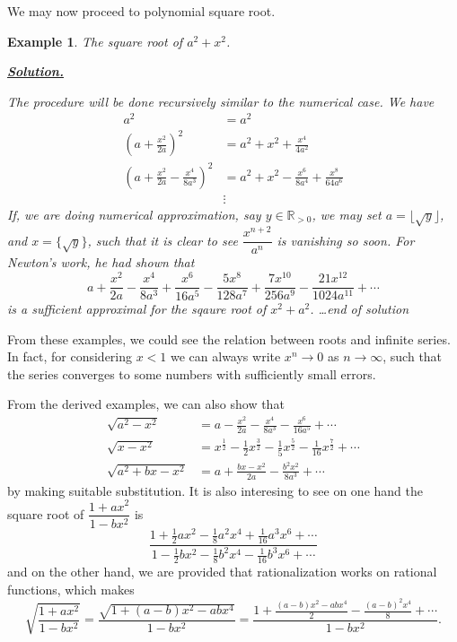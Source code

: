 \documentclass[12pt]{article}
\newtheorem*{example}{Example}
\newenvironment{solution}{\begin{snugshade*} \underline{\textbf{Solution.}} \par}{\hfill \textit{\dots end of solution} \end{snugshade*}}
\begin{document}
    We may now proceed to polynomial square root.

    \begin{example}
        The square root of $a^2+x^2$.

        \begin{solution}
            The procedure will be done recursively similar to the numerical case. We have \begin{align*}
                a^2&=a^2\\
                (a+\frac{x^2}{2a})^2&=a^2+x^2+\frac{x^4}{4a^2}\\
                (a+\frac{x^2}{2a}-\frac{x^4}{8a^3})^2&=a^2+x^2-\frac{x^6}{8a^4}+\frac{x^8}{64a^6}\\
                &\vdots
            \end{align*}
            If, we are doing numerical approximation, say $y\in\mathbb{R}_{>0}$, we may set $a=\lfloor \sqrt{y} \rfloor$, and $x=\{\sqrt{y}\}$, such that it is clear to see $\dfrac{x^{n+2}}{a^n}$ is vanishing so soon. For Newton's work, he had shown that \[a+\frac{x^2}{2a}-\frac{x^4}{8a^3}+\frac{x^{6}}{16a^5}-\frac{5x^8}{128a^7}+\frac{7x^{10}}{256a^9}-\frac{21x^{12}}{1024a^{11}}+\cdots\] is a sufficient approximal for the sqaure root of $x^2+a^2$.
        \end{solution}
    \end{example}

    From these examples, we could see the relation between roots and infinite series. In fact, for considering $x<1$ we can always write $x^n\to 0$ as $n\to \infty$, such that the series converges to some numbers with sufficiently small errors.

    From the derived examples, we can also show that \begin{align*}
        \sqrt{a^2-x^2}&=a-\frac{x^2}{2a}-\frac{x^4}{8a^3}-\frac{x^6}{16a^5}+\cdots\\
        \sqrt{x-x^2}&=x^{\frac{1}{2}}-\frac{1}{2}x^{\frac{3}{2}}-\frac{1}{5}x^{\frac{5}{2}}-\frac{1}{16}x^{\frac{7}{2}}+\cdots\\
        \sqrt{a^2+bx-x^2}&=a+\frac{bx-x^2}{2a}-\frac{b^2x^2}{8a^3}+\cdots
    \end{align*}
    by making suitable substitution. It is also interesing to see on one hand the square root of $\dfrac{1+ax^2}{1-bx^2}$ is \[\frac{1+\frac{1}{2}ax^2-\frac{1}{8}a^2x^4+\frac{1}{16}a^3x^6+\cdots}{1-\frac{1}{2}bx^2-\frac{1}{8}b^2x^4-\frac{1}{16}b^3x^6+\cdots}\] and on the other hand, we are provided that rationalization works on rational functions, which makes \[\sqrt{\dfrac{1+ax^2}{1-bx^2}}=\frac{\sqrt{1+(a-b)x^2-abx^4}}{1-bx^2}=\frac{1+\frac{(a-b)x^2-abx^4}{2}-\frac{(a-b)^2x^4}{8}+\cdots}{1-bx^2}.\]
\end{document}
